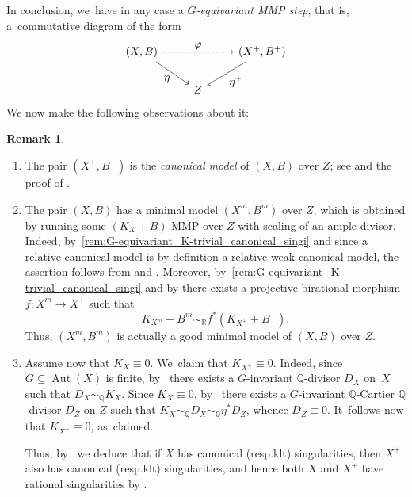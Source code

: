 \documentclass[10pt]{amsart}
\newcommand{\resp}{resp.}
\newcommand{\skpt}{\par\smallskip\noindent}
\let\ts\textstyle
\theoremstyle{plain}
\theoremstyle{definition}
\newtheorem{rem}[thm]{Remark}
\newcommand{\Q}{\mathbb{Q}}
\newcommand{\R}{\mathbb{R}}
\DeclareMathOperator{\Aut}{Aut}
\begin{document}
In conclusion, we~have in any case a \emph{$G$\nobreakdash-equivariant MMP step}, that is, a~commutative diagram of the form
\[
\begin{tikzcd}
(X, B) \arrow[dr, "\ts \eta" swap] \arrow[rr, "\ts \varphi", dashed] && (X^+, B^+) \arrow[dl, "\ts \eta^+"] \\
& Z
\end{tikzcd}
\]
We now make the following observations about it:

\skpt
\begin{rem}
\label{rem:G-equivariant_K-trivial_canonical_sing}
\begin{enumerate}
\item\label{rem:G-equivariant_K-trivial_canonical_singi}
The pair $(X^+,B^+)$ is the \emph{canonical model} of $(X,B)$ over $Z$; see \cite[Def.\,4.8.1]{Fuj17book} and the proof of \cite[Prop.\,4.2.2]{Pro21}.

\item\label{rem:G-equivariant_K-trivial_canonical_singii}
The pair $(X,B)$ has a minimal model $(X^m, B^m)$ over $Z$, which is obtained by running some $(K_X+B)$-MMP over $Z$ with scaling of an ample divisor. Indeed, by~\eqref{rem:G-equivariant_K-trivial_canonical_singi} and since a relative canonical model is by definition a relative weak canonical model, the assertion follows from \cite[Cor.\,3.7]{Bir12a} and \cite[Th.\,1.7]{HH20}.
Moreover, by~\eqref{rem:G-equivariant_K-trivial_canonical_singi} and by \cite[Lem.\,4.8.4]{Fuj17book} there exists a projective birational morphism $ f \colon X^m \to X^+ $ such that
\[
K_{X^m} + B^m \sim_\R f^* (K_{X^+} + B^+).
\]
Thus, $(X^m, B^m)$ is actually a good minimal model of $(X,B)$ over $Z$.

\item\label{rem:G-equivariant_K-trivial_canonical_singiii}
Assume now that $K_X \equiv 0$. We~claim that $K_{X^+} \equiv 0$. Indeed, since $G \subseteq \Aut(X)$ is finite, by~\cite[Lem.\,1.1.2]{Pro21} there exists a $G$\nobreakdash-invariant $\Q$\nobreakdash-divisor $D_X$ on~$X$ such that $D_X \sim_\Q K_X$.
Since $K_X \equiv 0$, by~\cite[Th.\,3.3.1(iii)]{Pro21} there exists a $G$\nobreakdash-invariant $\Q$\nobreakdash-Cartier $\Q$\nobreakdash-divisor $D_Z$ on $Z$ such that $K_X \sim_\Q D_X \sim_\Q \eta^* D_Z$, whence $D_Z \equiv 0$. It~follows now that $K_{X^+} \equiv 0$, as~claimed.

Thus, by~\cite[Lem.\,3.38]{KM98} we deduce that if $X$ has canonical (\resp klt) singularities, then $X^+$ also has canonical (\resp klt) singularities, and hence both $X$ and $X^+$ have rational singularities by \cite[Th.\,5.22]{KM98}.
\end{enumerate}
\end{rem}
\end{document}
